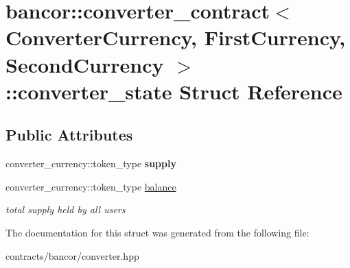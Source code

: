 \hypertarget{structbancor_1_1converter__contract_1_1converter__state}{}\section{bancor\+:\+:converter\+\_\+contract$<$ Converter\+Currency, First\+Currency, Second\+Currency $>$\+:\+:converter\+\_\+state Struct Reference}
\label{structbancor_1_1converter__contract_1_1converter__state}
\subsection*{Public Attributes}
\begin{DoxyCompactItemize}
\item 
\mbox{\label{structbancor_1_1converter__contract_1_1converter__state_a3417275407c09f68e27dd3119bb82953}} 
converter\+\_\+currency\+::token\+\_\+type {\bfseries supply}
\item 
\mbox{\label{structbancor_1_1converter__contract_1_1converter__state_a73166e73a1a757c0955a59bd55588337}} 
converter\+\_\+currency\+::token\+\_\+type \mbox{\hyperlink{structbancor_1_1converter__contract_1_1converter__state_a73166e73a1a757c0955a59bd55588337}{balance}}
\begin{DoxyCompactList}\small\item\em total supply held by all users \end{DoxyCompactList}\end{DoxyCompactItemize}


The documentation for this struct was generated from the following file\+:\begin{DoxyCompactItemize}
\item 
contracts/bancor/converter.\+hpp\end{DoxyCompactItemize}
